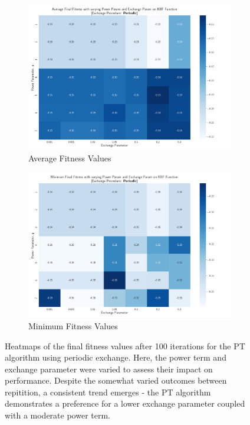 \documentclass[10pt]{article}
\begin{document}
\begin{multicols}{2}
\begin{figure}[H]
    \centering
    \begin{subfigure}{0.48\textwidth}
        \centering
        \includegraphics[width=\textwidth]{../figures/Permanent Images/PT_Avg_Fitness_Heatmap_Periodic.png}
        \caption{Average Fitness Values}
        \label{fig:avg_periodic_heatmap}
    \end{subfigure}
    \begin{subfigure}{0.48\textwidth}
        \centering
        \includegraphics[width=\textwidth]{../figures/Permanent Images/PT_Min_Fitness_Heatmap_Periodic.png}
        \caption{Minimum Fitness Values}
        \label{fig:min_periodic_heatmap}
    \end{subfigure}
    \captionsetup{justification=centering}
    \caption{Heatmaps of the final fitness values after 100 iterations for the PT algorithm using periodic exchange. Here, the power term and exchange parameter were varied to assess their impact on performance. Despite the somewhat varied outcomes between repitition, a consistent trend emerges - the PT algorithm demonstrates a preference for a lower exchange parameter coupled with a moderate power term.}
    \label{fig:heatmap_periodic}
\end{figure}


\end{multicols}
\end{document}
